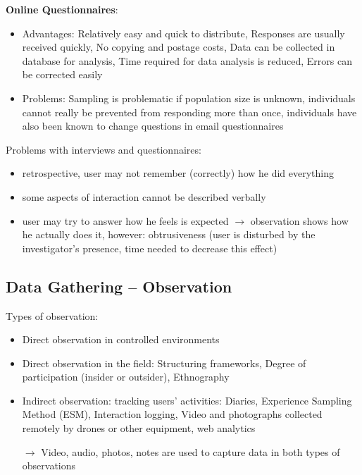 \textbf{Online Questionnaires}:
\begin{itemize}
\item Advantages: Relatively easy and quick to distribute, Responses are usually received quickly, No copying and postage costs, Data can be collected in database for analysis, Time required for data analysis is reduced, Errors can be corrected easily
\item Problems: Sampling is problematic if population size is unknown, individuals cannot really be prevented from responding more than once, individuals have also been known to change questions in email questionnaires
\end{itemize}
Problems with interviews and questionnaires:
\begin{itemize}
\item retrospective, user may not remember (correctly) how he did everything
\item some aspects of interaction cannot be described verbally
\item user may try to answer how he feels is expected $\rightarrow$ observation shows how he actually does it, however: obtrusiveness (user is disturbed by the investigator's presence, time needed to decrease this effect)
\end{itemize}
\subsection{Data Gathering -- Observation}
Types of observation:
\begin{itemize}
\item Direct observation in controlled environments
\item Direct observation in the field: Structuring frameworks, Degree of participation (insider or outsider), Ethnography
\item Indirect observation: tracking users’ activities: Diaries, Experience Sampling Method (ESM), Interaction logging, Video and photographs collected remotely by drones or other equipment, web analytics
\item[$\rightarrow$] Video, audio, photos, notes are used to capture data in both types of observations
\end{itemize}

